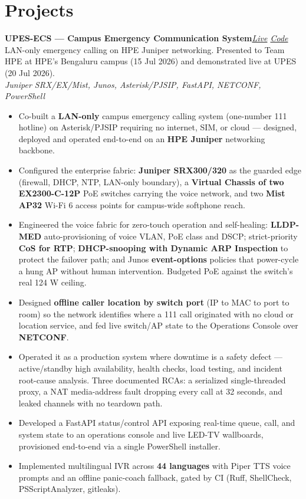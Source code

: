 \documentclass[10pt,a4paper]{article}
\newcommand{\entry}[3]{%
  \textbf{#1}\hfill\textit{\small #2}\\[-0.15em]
  {\small #3}\par\vspace{0.08em}%
}
\begin{document}
\section{Projects}
\entry{UPES-ECS --- Campus Emergency Communication System}{\href{https://upes-ecs.rohanbatra.in}{Live} \textbar{} \href{https://github.com/rohanbatrain/UPES-ECS}{Code}}{LAN-only emergency calling on HPE Juniper networking. Presented to Team HPE at HPE's Bengaluru campus (15 Jul 2026) and demonstrated live at UPES (20 Jul 2026).\\ \textit{Juniper SRX/EX/Mist, Junos, Asterisk/PJSIP, FastAPI, NETCONF, PowerShell}}
\begin{itemize}
  \item Co-built a \textbf{LAN-only} campus emergency calling system (one-number 111 hotline) on Asterisk/PJSIP requiring no internet, SIM, or cloud --- designed, deployed and operated end-to-end on an \textbf{HPE Juniper} networking backbone.
  \item Configured the enterprise fabric: \textbf{Juniper SRX300/320} as the guarded edge (firewall, DHCP, NTP, LAN-only boundary), a \textbf{Virtual Chassis of two EX2300-C-12P} PoE switches carrying the voice network, and two \textbf{Mist AP32} Wi-Fi 6 access points for campus-wide softphone reach.
  \item Engineered the voice fabric for zero-touch operation and self-healing: \textbf{LLDP-MED} auto-provisioning of voice VLAN, PoE class and DSCP; strict-priority \textbf{CoS for RTP}; \textbf{DHCP-snooping with Dynamic ARP Inspection} to protect the failover path; and Junos \textbf{event-options} policies that power-cycle a hung AP without human intervention. Budgeted PoE against the switch's real 124 W ceiling.
  \item Designed \textbf{offline caller location by switch port} (IP to MAC to port to room) so the network identifies where a 111 call originated with no cloud or location service, and fed live switch/AP state to the Operations Console over \textbf{NETCONF}.
  \item Operated it as a production system where downtime is a safety defect --- active/standby high availability, health checks, load testing, and incident root-cause analysis. Three documented RCAs: a serialized single-threaded proxy, a NAT media-address fault dropping every call at 32 seconds, and leaked channels with no teardown path.
  \item Developed a FastAPI status/control API exposing real-time queue, call, and system state to an operations console and live LED-TV wallboards, provisioned end-to-end via a single PowerShell installer.
  \item Implemented multilingual IVR across \textbf{44 languages} with Piper TTS voice prompts and an offline panic-coach fallback, gated by CI (Ruff, ShellCheck, PSScriptAnalyzer, gitleaks).
\end{itemize}
\end{document}
